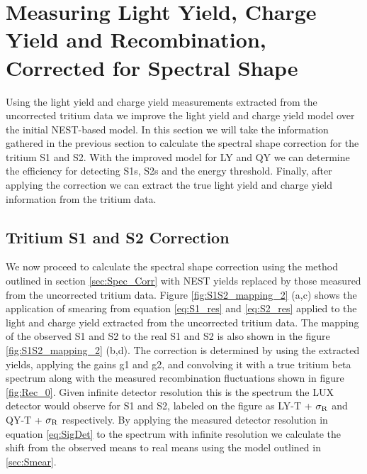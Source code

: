 \newpage

\section{Measuring Light Yield, Charge Yield and Recombination, Corrected for Spectral Shape}

Using the light yield and charge yield measurements extracted from the uncorrected tritium data we improve the light yield and charge yield model over the initial NEST-based model. In this section we will take the information gathered in the previous section to calculate the spectral shape correction for the tritium S1 and S2. With the improved model for LY and QY we can determine the efficiency for detecting S1s, S2s and the energy threshold. Finally, after applying the correction we can extract the true light yield and charge yield information from the tritium data.

\subsection{Tritium S1 and S2 Correction}

We now proceed to calculate the spectral shape correction using the method outlined in section \ref{sec:Spec_Corr} with NEST yields replaced by those measured from the uncorrected tritium data. Figure \ref{fig:S1S2_mapping_2} (a,c) shows the application of smearing from equation \ref{eq:S1_res} and \ref{eq:S2_res} applied to the light and charge yield extracted from the uncorrected tritium data. The mapping of the observed S1 and S2 to the real S1 and S2 is also shown in the figure \ref{fig:S1S2_mapping_2} (b,d). The correction is determined by using the extracted yields, applying the gains g1 and g2, and convolving it with a true tritium beta spectrum along with the measured recombination fluctuations shown in figure \ref{fig:Rec_0}. Given infinite detector resolution this is the spectrum the LUX detector would observe for S1 and S2, labeled on the figure as LY-T + $\rm \sigma_R$ and QY-T + $\rm \sigma_R$ respectively. By applying the measured detector resolution in equation \ref{eq:SigDet} to the spectrum with infinite resolution we calculate the shift from the observed means to real means using the model outlined in \ref{sec:Smear}.


